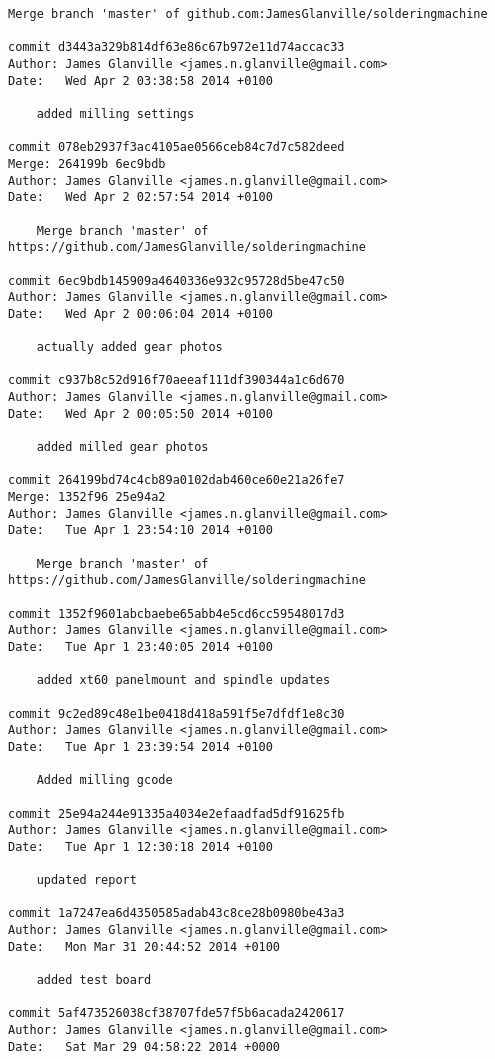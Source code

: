 \documentclass[a4paper,11pt]{article}  %
\begin{document}
\begin{lstlisting}[frame=single]
    Merge branch 'master' of github.com:JamesGlanville/solderingmachine

commit d3443a329b814df63e86c67b972e11d74accac33
Author: James Glanville <james.n.glanville@gmail.com>
Date:   Wed Apr 2 03:38:58 2014 +0100

    added milling settings

commit 078eb2937f3ac4105ae0566ceb84c7d7c582deed
Merge: 264199b 6ec9bdb
Author: James Glanville <james.n.glanville@gmail.com>
Date:   Wed Apr 2 02:57:54 2014 +0100

    Merge branch 'master' of https://github.com/JamesGlanville/solderingmachine

commit 6ec9bdb145909a4640336e932c95728d5be47c50
Author: James Glanville <james.n.glanville@gmail.com>
Date:   Wed Apr 2 00:06:04 2014 +0100

    actually added gear photos

commit c937b8c52d916f70aeeaf111df390344a1c6d670
Author: James Glanville <james.n.glanville@gmail.com>
Date:   Wed Apr 2 00:05:50 2014 +0100

    added milled gear photos

commit 264199bd74c4cb89a0102dab460ce60e21a26fe7
Merge: 1352f96 25e94a2
Author: James Glanville <james.n.glanville@gmail.com>
Date:   Tue Apr 1 23:54:10 2014 +0100

    Merge branch 'master' of https://github.com/JamesGlanville/solderingmachine

commit 1352f9601abcbaebe65abb4e5cd6cc59548017d3
Author: James Glanville <james.n.glanville@gmail.com>
Date:   Tue Apr 1 23:40:05 2014 +0100

    added xt60 panelmount and spindle updates

commit 9c2ed89c48e1be0418d418a591f5e7dfdf1e8c30
Author: James Glanville <james.n.glanville@gmail.com>
Date:   Tue Apr 1 23:39:54 2014 +0100

    Added milling gcode

commit 25e94a244e91335a4034e2efaadfad5df91625fb
Author: James Glanville <james.n.glanville@gmail.com>
Date:   Tue Apr 1 12:30:18 2014 +0100

    updated report

commit 1a7247ea6d4350585adab43c8ce28b0980be43a3
Author: James Glanville <james.n.glanville@gmail.com>
Date:   Mon Mar 31 20:44:52 2014 +0100

    added test board

commit 5af473526038cf38707fde57f5b6acada2420617
Author: James Glanville <james.n.glanville@gmail.com>
Date:   Sat Mar 29 04:58:22 2014 +0000


\end{lstlisting}
\end{document}
